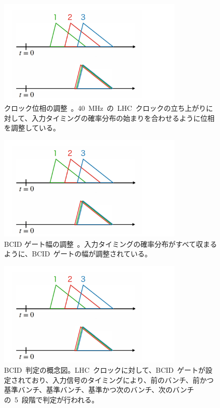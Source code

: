 \begin{figure}[H]
        \centering   
        \includegraphics[width=0.8\textwidth,page=2]{img/slide/slide.pdf}
        \caption[クロック位相の調整]{クロック位相の調整~\cite{URL:09}。40~MHz~の~LHC~クロックの立ち上がりに対して、入力タイミングの確率分布の始まりを合わせるように位相を調整している。}
        \label{fig:clock}
\end{figure}
\begin{figure}[H]
        \centering   
        \includegraphics[width=0.8\textwidth,page=3]{img/slide/slide.pdf}
        \caption[BCID~ゲート幅の調整]{BCID ゲート幅の調整~\cite{URL:09}。入力タイミングの確率分布がすべて収まるように、BCID~ゲートの幅が調整されている。}
        \label{fig:gate0}
\end{figure}
\begin{figure}[H]
        \centering   
        \includegraphics[width=0.8\textwidth,page=4]{img/slide/slide.pdf}
        \caption[BCID~判定の概念図]{BCID~判定の概念図。LHC~クロックに対して、BCID~ゲートが設定されており、入力信号のタイミングにより、前のバンチ、前かつ基準バンチ、基準バンチ、基準かつ次のバンチ、次のバンチの~5~段階で判定が行われる。}
        \label{fig:bcid0}
\end{figure}

